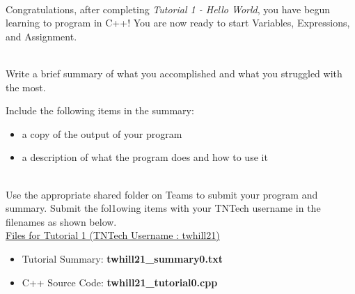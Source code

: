 \documentclass[12pt]{article}
\begin{document}
\begin{description}[labelindent=1cm]
\begin{enumerate}
	\end{enumerate}

\item[\textbf{\underline{Tutorial Complete:}}] \hfill \vspace{3mm}\\ 
	Congratulations, after completing {\it Tutorial 1 - Hello World}, you have begun learning to program in C++! You are now ready to start Variables, Expressions, and Assignment. \\


\newpage
\item[\textbf{\underline{Tutorial Summary:}}] \hfill \vspace{3mm}\\ 
Write a brief summary of what you accomplished and what you struggled with the most. 

Include the following items in the summary:
\begin{itemize}

\item a copy of the output of your program
\item a description of what the program does and how to use it

\end{itemize}


\item[\textbf{\underline{Submission on Teams:}}] \hfill \vspace{3mm}\\ 
Use the appropriate shared folder on Teams to submit your program and summary. Submit the fol1owing items with your TNTech username in the filenames as shown below. \vspace{0mm}\\

\underline{Files for Tutorial 1 (TNTech Username : twhill21)}

\begin{itemize}

\item Tutorial Summary: \textbf{ twhill21\_summary0.txt}

\item C++ Source Code: \textbf{ twhill21\_tutorial0.cpp}

\end{itemize}


\end{description}
\end{document}
